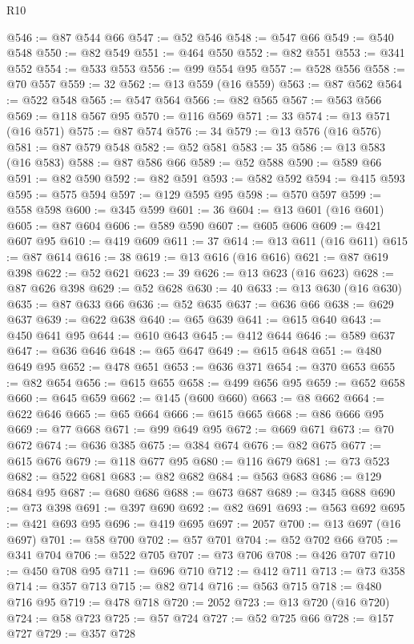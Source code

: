 \begin{lexlean}{R10}
\begin{coremodule}
@546 := @87 @544 @66
@547 := @52 @546
@548 := @547 @66
@549 := @540 @548
@550 := @82 @549
@551 := @464 @550
@552 := @82 @551
@553 := @341 @552
@554 := @533 @553
@556 := @99 @554 @95
@557 := @528 @556
@558 := @70 @557
@559 := 32
@562 := @13 @559 (@16 @559)
@563 := @87 @562
@564 := @522 @548
@565 := @547 @564
@566 := @82 @565
@567 := @563 @566
@569 := @118 @567 @95
@570 := @116 @569
@571 := 33
@574 := @13 @571 (@16 @571)
@575 := @87 @574
@576 := 34
@579 := @13 @576 (@16 @576)
@581 := @87 @579 @548
@582 := @52 @581
@583 := 35
@586 := @13 @583 (@16 @583)
@588 := @87 @586 @66
@589 := @52 @588
@590 := @589 @66
@591 := @82 @590
@592 := @82 @591
@593 := @582 @592
@594 := @415 @593
@595 := @575 @594
@597 := @129 @595 @95
@598 := @570 @597
@599 := @558 @598
@600 := @345 @599
@601 := 36
@604 := @13 @601 (@16 @601)
@605 := @87 @604
@606 := @589 @590
@607 := @605 @606
@609 := @421 @607 @95
@610 := @419 @609
@611 := 37
@614 := @13 @611 (@16 @611)
@615 := @87 @614
@616 := 38
@619 := @13 @616 (@16 @616)
@621 := @87 @619 @398
@622 := @52 @621
@623 := 39
@626 := @13 @623 (@16 @623)
@628 := @87 @626 @398
@629 := @52 @628
@630 := 40
@633 := @13 @630 (@16 @630)
@635 := @87 @633 @66
@636 := @52 @635
@637 := @636 @66
@638 := @629 @637
@639 := @622 @638
@640 := @65 @639
@641 := @615 @640
@643 := @450 @641 @95
@644 := @610 @643
@645 := @412 @644
@646 := @589 @637
@647 := @636 @646
@648 := @65 @647
@649 := @615 @648
@651 := @480 @649 @95
@652 := @478 @651
@653 := @636 @371
@654 := @370 @653
@655 := @82 @654
@656 := @615 @655
@658 := @499 @656 @95
@659 := @652 @658
@660 := @645 @659
@662 := @145 (@600 @660)
@663 := @8 @662
@664 := @622 @646
@665 := @65 @664
@666 := @615 @665
@668 := @86 @666 @95
@669 := @77 @668
@671 := @99 @649 @95
@672 := @669 @671
@673 := @70 @672
@674 := @636 @385
@675 := @384 @674
@676 := @82 @675
@677 := @615 @676
@679 := @118 @677 @95
@680 := @116 @679
@681 := @73 @523
@682 := @522 @681
@683 := @82 @682
@684 := @563 @683
@686 := @129 @684 @95
@687 := @680 @686
@688 := @673 @687
@689 := @345 @688
@690 := @73 @398
@691 := @397 @690
@692 := @82 @691
@693 := @563 @692
@695 := @421 @693 @95
@696 := @419 @695
@697 := 2057
@700 := @13 @697 (@16 @697)
@701 := @58 @700
@702 := @57 @701
@704 := @52 @702 @66
@705 := @341 @704
@706 := @522 @705
@707 := @73 @706
@708 := @426 @707
@710 := @450 @708 @95
@711 := @696 @710
@712 := @412 @711
@713 := @73 @358
@714 := @357 @713
@715 := @82 @714
@716 := @563 @715
@718 := @480 @716 @95
@719 := @478 @718
@720 := 2052
@723 := @13 @720 (@16 @720)
@724 := @58 @723
@725 := @57 @724
@727 := @52 @725 @66
@728 := @157 @727
@729 := @357 @728

\end{coremodule}
\end{lexlean}
